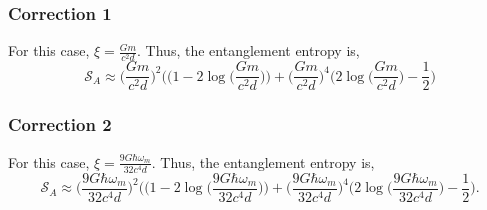 \documentclass[12pt,a4paper]{report}
\theoremstyle{plain}
\theoremstyle{definition}
\theoremstyle{remark}
\begin{document}
\subsubsection{Correction 1}
For this case, $\xi = \frac{Gm}{c^2d}.$
Thus, the entanglement entropy is,
\begin{equation}
    \mathcal{S}_A \approx \Big(\frac{Gm}{c^2d}\Big)^2 \Big((1 - 2\log\Big(\frac{Gm}{c^2d}\Big)\Big) + \Big(\frac{Gm}{c^2d}\Big)^4 \Big(2\log\Big(\frac{Gm}{c^2d}\Big) - \frac{1}{2}\Big)
\end{equation}
\subsubsection{Correction 2}
For this case, $\xi = \frac{9G\hbar\omega_m}{32c^4d}.$
Thus, the entanglement entropy is,
\begin{equation}
    \mathcal{S}_A \approx \Big(\frac{9G\hbar\omega_m}{32c^4d}\Big)^2 \Big((1 - 2\log\Big(\frac{9G\hbar\omega_m}{32c^4d}\Big)\Big) + \Big(\frac{9G\hbar\omega_m}{32c^4d}\Big)^4 \Big(2\log\Big(\frac{9G\hbar\omega_m}{32c^4d}\Big) - \frac{1}{2}\Big).
\end{equation}
\newpage
\end{document}
